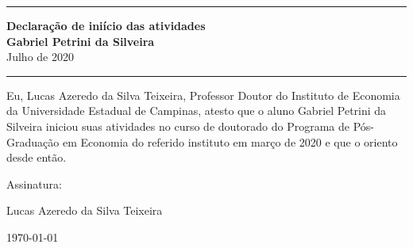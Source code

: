 \documentclass[11pt,a4paper]{article}
\date{Julho de 2020}
\def\myauthor{Lucas Azeredo da Silva Teixeira} %
\def\mydate{\today} %
\begin{document}
\begin{center}
	\rule{\textwidth}{1.2pt}
	\textbf{Declaração de iniício das atividades}\\
	\Large\textbf{Gabriel Petrini da Silveira}\\
	Julho de 2020
	\rule{\textwidth}{1.2pt}
\end{center}

\vspace{5cm}

Eu, Lucas Azeredo da Silva Teixeira, Professor Doutor do Instituto de Economia da Universidade Estadual de Campinas, atesto que o aluno Gabriel Petrini da Silveira iniciou suas atividades no curso de doutorado do Programa de Pós-Graduação em Economia do referido instituto em março de 2020 e que o oriento desde então.


\vspace{5cm}	
Assinatura: \hrulefill
\begin{center}
	
	\hspace*{0mm}\phantom{Nome: }\myauthor
	
	\hspace*{0mm}\phantom{Data: }\mydate
	
\end{center}	
\end{document}
